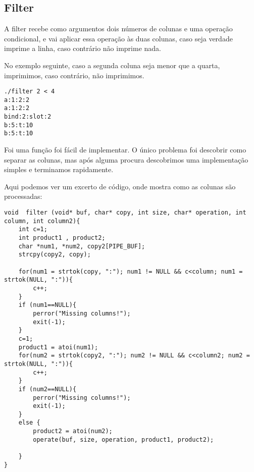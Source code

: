 \documentclass{article}
\begin{document}
\subsection{Filter}
A filter recebe como argumentos dois números de colunas e uma operação condicional, e vai aplicar essa operação às duas colunas, caso seja verdade imprime a linha, caso contrário não imprime nada.
\par No exemplo seguinte, caso a segunda coluna seja menor que a quarta, imprimimos, caso contrário, não imprimimos.
\begin{lstlisting}
./filter 2 < 4
a:1:2:2
a:1:2:2
bind:2:slot:2
b:5:t:10
b:5:t:10
\end{lstlisting}
\par Foi uma função foi fácil de implementar. O único problema foi descobrir como separar as colunas, mas após alguma procura descobrimos uma implementação simples e terminamos rapidamente.
\par Aqui podemos ver um excerto de código, onde mostra como as colunas são processadas:
\begin{lstlisting}
void  filter (void* buf, char* copy, int size, char* operation, int column, int column2){
    int c=1;
    int product1 , product2;
    char *num1, *num2, copy2[PIPE_BUF];
    strcpy(copy2, copy);

    for(num1 = strtok(copy, ":"); num1 != NULL && c<column; num1 = strtok(NULL, ":")){
        c++;
    }
    if (num1==NULL){
        perror("Missing columns!");
        exit(-1);
    }
    c=1;
    product1 = atoi(num1);
    for(num2 = strtok(copy2, ":"); num2 != NULL && c<column2; num2 = strtok(NULL, ":")){
        c++;
    }
    if (num2==NULL){
        perror("Missing columns!");
        exit(-1);
    }
    else {
        product2 = atoi(num2);
        operate(buf, size, operation, product1, product2);

    }
}
\end{lstlisting}
\end{document}
